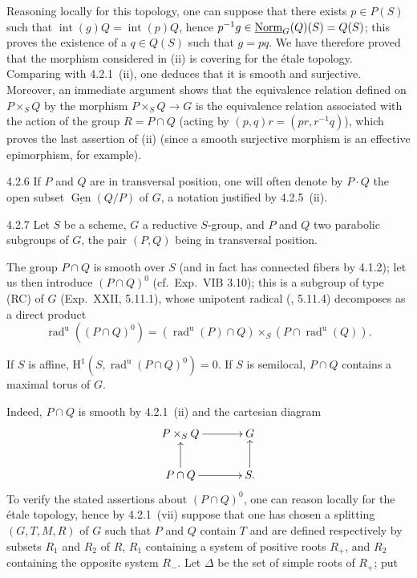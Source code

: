 Reasoning locally for this topology, one can suppose that there exists $p\in P(S)$ such that $\operatorname{int}(g)Q=\operatorname{int}(p)Q$, hence $p^{-1}g\in\underline{\mathrm{Norm}}_G(Q)(S)=Q(S)$; this proves the existence of a $q\in Q(S)$ such that $g=pq$. We have therefore proved that the morphism considered in (ii) is covering for the \'etale topology. Comparing with 4.2.1~(ii), one deduces that it is smooth and surjective. Moreover, an immediate argument shows that the equivalence relation defined on $P\times_S Q$ by the morphism $P\times_S Q\to G$ is the equivalence relation associated with the action of the group $R=P\cap Q$ (acting by $(p,q)r=(pr,r^{-1}q)$), which proves the last assertion of (ii) (since a smooth surjective morphism is an effective epimorphism, for example).
\begin{remark}{4.2.6}\label{XXVI.4.2.6}
If $P$ and $Q$ are in transversal position, one will often denote by $P\cdot Q$ the open subset $\underline{\operatorname{Gen}}(Q/P)$ of $G$, a notation justified by 4.2.5~(ii).
\end{remark}
\begin{proposition}{4.2.7}\label{XXVI.4.2.7}
Let $S$ be a scheme, $G$ a reductive $S$-group, and $P$ and $Q$ two parabolic subgroups of $G$, the pair $(P,Q)$ being in transversal position.
\begin{enumeratei}
\item The group $P\cap Q$ is smooth over $S$ (and in fact has connected fibers by 4.1.2); let us then introduce $(P\cap Q)^0$ (cf.~Exp.~VIB 3.10); this is a subgroup of type (RC) of $G$ (Exp.~XXII, 5.11.1), whose unipotent radical (\loccit, 5.11.4) decomposes as a direct product
\[
\operatorname{rad}^{\mathrm u}((P\cap Q)^0)=
(\operatorname{rad}^{\mathrm u}(P)\cap Q)\times_S(P\cap\operatorname{rad}^{\mathrm u}(Q)).
\]
\item If $S$ is affine, $\mathrm H^1(S,\operatorname{rad}^{\mathrm u}(P\cap Q)^0)=0$. If $S$ is semilocal, $P\cap Q$ contains a maximal torus of $G$.
\end{enumeratei}
\end{proposition}
Indeed, $P\cap Q$ is smooth by 4.2.1~(ii) and the cartesian diagram
\[
\xymatrix@C=35pt@R=22pt{
P\times_S Q\ar[r]&G\\
P\cap Q\ar[r]\ar[u]&S.\ar[u]
}
\]
To verify the stated assertions about $(P\cap Q)^0$, one can reason locally for the \'etale topology, hence by 4.2.1~(vii) suppose that one has chosen a splitting $(G,T,M,R)$ of $G$ such that $P$ and $Q$ contain $T$ and are defined respectively by subsets $R_1$ and $R_2$ of $R$, $R_1$ containing a system of positive roots $R_+$, and $R_2$ containing the opposite system $R_-$. Let $\Delta$ be the set of simple roots of $R_+$; put
